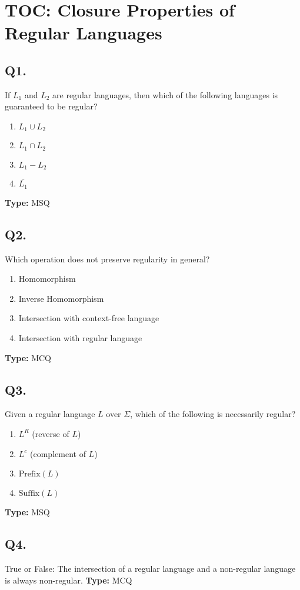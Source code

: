 \section{TOC: Closure Properties of Regular Languages}

\subsection*{Q1.}
If $L_1$ and $L_2$ are regular languages, then which of the following languages is guaranteed to be regular?  
\begin{enumerate}[label=(\alph*)]
    \item $L_1 \cup L_2$
    \item $L_1 \cap L_2$
    \item $L_1 - L_2$
    \item $\overline{L_1}$
\end{enumerate}
\textbf{Type:} MSQ

\subsection*{Q2.}
Which operation does not preserve regularity in general?
\begin{enumerate}[label=(\alph*)]
    \item Homomorphism
    \item Inverse Homomorphism
    \item Intersection with context-free language
    \item Intersection with regular language
\end{enumerate}
\textbf{Type:} MCQ

\subsection*{Q3.}
Given a regular language $L$ over $\Sigma$, which of the following is necessarily regular?
\begin{enumerate}[label=(\alph*)]
    \item $L^R$ (reverse of $L$)
    \item $L^c$ (complement of $L$)
    \item $\text{Prefix}(L)$
    \item $\text{Suffix}(L)$
\end{enumerate}
\textbf{Type:} MSQ

\subsection*{Q4.}
True or False: The intersection of a regular language and a non-regular language is always non-regular.  
\textbf{Type:} MCQ

